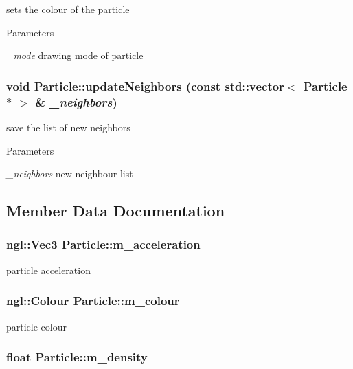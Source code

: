 sets the colour of the particle 
\begin{DoxyParams}{Parameters}
\item[{\em \_\-mode}]drawing mode of particle \end{DoxyParams}
\hypertarget{classParticle_a50dd1d5f58c0147fa3eba021adaf2752}{
\subsubsection[{updateNeighbors}]{\setlength{\rightskip}{0pt plus 5cm}void Particle::updateNeighbors (const std::vector$<$ {\bf Particle} $\ast$ $>$ \& {\em \_\-neighbors})}}
\label{classParticle_a50dd1d5f58c0147fa3eba021adaf2752}


save the list of new neighbors 
\begin{DoxyParams}{Parameters}
\item[{\em \_\-neighbors}]new neighbour list \end{DoxyParams}


\subsection{Member Data Documentation}
\hypertarget{classParticle_ab98ecf309cee41177c34fbd64f3f33a9}{
\subsubsection[{m\_\-acceleration}]{\setlength{\rightskip}{0pt plus 5cm}ngl::Vec3 {\bf Particle::m\_\-acceleration}}}
\label{classParticle_ab98ecf309cee41177c34fbd64f3f33a9}


particle acceleration \hypertarget{classParticle_a6095555452db7271e32380a188e1004e}{
\subsubsection[{m\_\-colour}]{\setlength{\rightskip}{0pt plus 5cm}ngl::Colour {\bf Particle::m\_\-colour}}}
\label{classParticle_a6095555452db7271e32380a188e1004e}


particle colour \hypertarget{classParticle_a7ef5758b3dbc3ea263b670012f0c2fe5}{
\subsubsection[{m\_\-density}]{\setlength{\rightskip}{0pt plus 5cm}float {\bf Particle::m\_\-density}}}
\label{classParticle_a7ef5758b3dbc3ea263b670012f0c2fe5}


